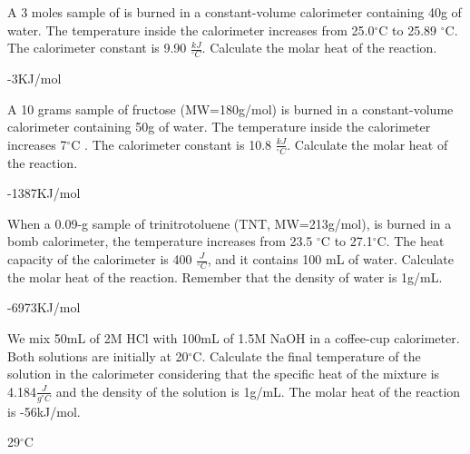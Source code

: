 \documentclass[main.tex]{subfiles}
\begin{document}
\begin{multicols*}{2}
\begin{question}[ID=\the\value{numA}]
A 3 moles sample of  is burned in a constant-volume calorimeter containing 40g of water. The temperature inside the calorimeter increases from 25.0$^{\circ}$C to 25.89 $^{\circ}$C. The calorimeter constant is 9.90 $\frac{kJ}{^{\circ}C}$.  Calculate the molar heat of the reaction. 
\end{question}
\begin{solution}
-3KJ/mol
 \hspace{0.1cm}\end{solution}
\begin{question}[ID=\the\value{numA}]
A 10 grams sample of fructose (MW=180g/mol) is burned in a constant-volume calorimeter containing 50g of water. The temperature inside the calorimeter increases 7$^{\circ}$C . The calorimeter constant is 10.8 $\frac{kJ}{^{\circ}C}$.  Calculate the molar heat of the reaction.
\end{question}
\begin{solution}
-1387KJ/mol
 \hspace{0.1cm}\end{solution}
\begin{question}[ID=\the\value{numA}]
When a 0.09-g sample of trinitrotoluene (TNT, MW=213g/mol), is burned in a bomb calorimeter, the temperature increases from 23.5 $^{\circ}$C to 27.1$^{\circ}$C. The heat capacity of the calorimeter is 400 $\frac{J}{^{\circ}C}$, and it contains 100 mL of water. Calculate the molar heat of the reaction. Remember that the density of water is 1g/mL.
\end{question}
\begin{solution}
-6973KJ/mol
 \hspace{0.1cm}\end{solution}
\begin{question}[ID=\the\value{numA}]
We mix 50mL of 2M HCl with 100mL of 1.5M NaOH in a coffee-cup calorimeter. Both solutions are initially at 20$^{\circ}$C. Calculate the final temperature of the solution in the calorimeter considering that the specific heat of the mixture is 4.184$\frac{J}{g^{\circ}C}$ and the density of the solution is 1g/mL. The molar heat of the reaction is -56kJ/mol.
\end{question}
\begin{solution}
29$^{\circ}$C
 \hspace{0.1cm}\end{solution}




\end{multicols*}
\end{document}
